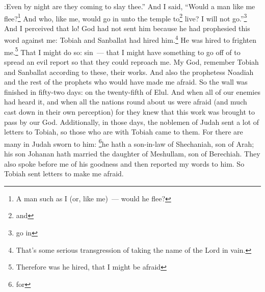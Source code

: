 \begin{enumerate*}[mode=unboxed]
:Even by night are they coming to slay thee.''%
     And I said, ``Would a man like me flee?\footnote{A man such as I (or, like me)~--- would he flee?} And who, like me, would go in unto the temple to\footnote{and} live? I will not go.''\footnote{go in}%
     And I perceived that lo! God had not sent him because he had prophesied this word against me: Tobiah and Sanballat had hired him.\footnote{That's some serious transgression of taking the name of the Lord in vain.}%
     He was hired to frighten me.\footnote{Therefore was he hired, that I might be afraid} That I might do so: sin~--- that I might have something to go off of to spread an evil report so that they could reproach me.%
     My God, remember Tobiah and Sanballat according to these, their works. And also the prophetess Noadiah and the rest of the prophets who would have made me afraid.%
     So the wall was finished in fifty-two days: on the twenty-fifth of Elul.%
     And when all of our enemies had heard it, and when all the nations round about us were afraid (and much cast down in their own perception) for they knew that this work was brought to pass by our God.%
     Additionally, in those days, the noblemen of Judah sent a lot of letters to Tobiah, so those who are with Tobiah came to them.%
     For there are many in Judah sworn to him: \footnote{for}he hath a son-in-law of Shechaniah, son of Arah; his son Johanan hath married the daughter of Meshullam, son of Berechiah.%
     They also spoke before me of his goodness and then reported my words to him. So Tobiah sent letters to make me afraid.%
\end{enumerate*}

